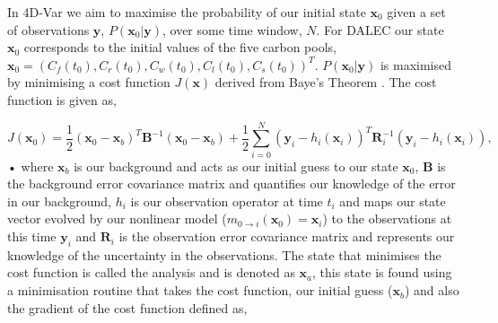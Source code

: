 \documentclass[11pt]{article}
\begin{document}
In 4D-Var we aim to maximise the probability of our initial state $\textbf{x}_0$ given a set of observations $\textbf{y}$, $P(\textbf{x}_0|\textbf{y})$, over some time window, $N$. For DALEC our state $\textbf{x}_0$ corresponds to the initial values of the five carbon pools,  $\textbf{x}_0 = (C_f(t_0), C_r(t_0), C_w(t_0), C_l(t_0), C_s(t_0))^T$. $P(\textbf{x}_0|\textbf{y})$ is maximised by minimising a cost function $J(\textbf{x})$ derived from Baye's Theorem \cite{lewis2006dynamic}. The cost function is given as,

\begin{equation}
J(\textbf{x}_0) = \frac{1}{2}(\textbf{x}_0-\textbf{x}_b)^{T}\textbf{B}^{-1}(\textbf{x}_0-\textbf{x}_b)+\frac{1}{2}\sum_{i=0}^{N}(\textbf{y}_i-h_i(\textbf{x}_i))^{T}\textbf{R}_{i}^{-1}(\textbf{y}_i-h_i(\textbf{x}_i)),
\end{equation}•
where $\textbf{x}_b$ is our background and acts as our initial guess to our state $\textbf{x}_0$, $\textbf{B}$ is the background error covariance matrix and quantifies our knowledge of the error in our background, $h_i$ is our observation operator at time $t_i$ and maps our state vector evolved by our nonlinear model ($m_{0\rightarrow i}(\mathbf{x}_{0})=\textbf{x}_i$) to the observations at this time $\textbf{y}_i$ and $\textbf{R}_i$ is the observation error covariance matrix and represents our knowledge of the uncertainty in the observations. The state that minimises the cost function is called the analysis and is denoted as $\textbf{x}_a$, this state is found using a minimisation routine that takes the cost function, our initial guess ($\textbf{x}_b$) and also the gradient of the cost function defined as,
\end{document}
